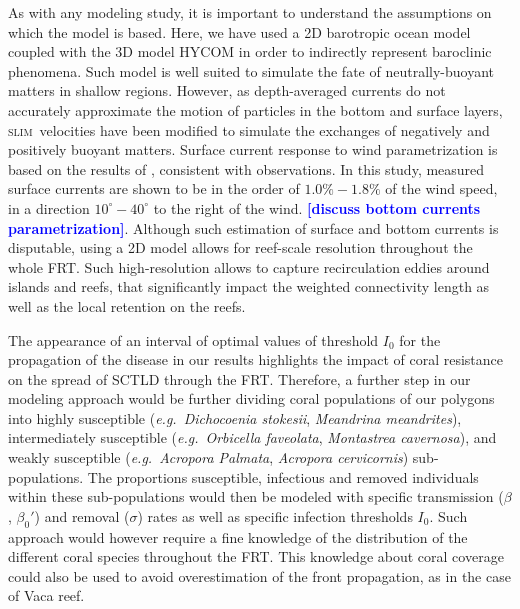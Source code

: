 \documentclass[utf8]{frontiersSCNS}
\newcommand{\slim}{\textsc{slim}\ }
\newcommand{\eg}{{\it e.g.}\ }
\newcommand{\lew}[1]{\textbf{\textcolor{blue}{#1}}}
\begin{document}
As with any modeling study, it is important to understand the assumptions on which the model is based. Here, we have used a 2D barotropic ocean model coupled with the 3D model HYCOM \citep{Chassignet2007} in order to indirectly represent baroclinic phenomena. Such model is well suited to simulate the fate of neutrally-buoyant matters in shallow regions. However, as depth-averaged currents do not accurately approximate the motion of particles in the bottom and surface layers, \slim velocities have been modified to simulate the exchanges of negatively and positively buoyant matters. Surface current response to wind parametrization is based on the results of \cite{ardhuin2009observation}, consistent with observations. In this study, measured surface currents are shown to be in the order of $1.0\% - 1.8\%$ of the wind speed, in a direction $10^\circ - 40^\circ$ to the right of the wind. \lew{[discuss bottom currents parametrization]}. Although such estimation of surface and bottom currents is disputable, using a 2D model allows for reef-scale resolution throughout the whole FRT. Such high-resolution allows to capture recirculation eddies around islands and reefs, that significantly impact the weighted connectivity length as well as the local retention on the reefs.

The appearance of an interval of optimal values of threshold $I_0$ for the propagation of the disease in our results highlights the impact of coral resistance on the spread of SCTLD through the FRT. Therefore, a further step in our modeling approach would be further dividing coral populations of our polygons into highly susceptible (\eg \textit{Dichocoenia stokesii}, \textit{Meandrina meandrites}), intermediately susceptible (\eg \textit{Orbicella faveolata}, \textit{Montastrea cavernosa}), and weakly susceptible (\eg \textit{Acropora Palmata}, \textit{Acropora cervicornis}) sub-populations. The proportions susceptible, infectious and removed individuals within these sub-populations would then be modeled with specific transmission ($\beta$, $\beta_0'$) and removal ($\sigma$) rates as well as specific infection thresholds $I_0$. Such approach would however require a fine knowledge of the distribution of the different coral species throughout the FRT. This knowledge about coral coverage could also be used to avoid overestimation of the front propagation, as in the case of Vaca reef.
\end{document}
